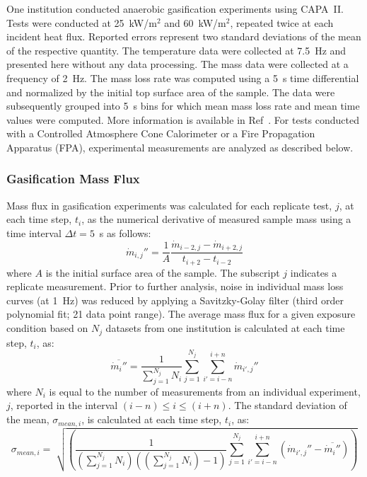 \documentclass{book}
\begin{document}
One institution conducted anaerobic gasification experiments using CAPA~II. Tests were conducted at 25~kW/m$^2$ and 60~kW/m$^2$, repeated twice at each incident heat flux. Reported errors represent two standard deviations of the mean of the respective quantity. The temperature data were collected at 7.5~Hz and presented here without any data processing. The mass data were collected at a frequency of 2~Hz. The mass loss rate was computed using a 5~s time differential and normalized by the initial top surface area of the sample. The data were subsequently grouped into 5~s bins for which mean mass loss rate and mean time values were computed. More information is available in Ref~\cite{fiola2020comparison}. For tests conducted with a Controlled Atmosphere Cone Calorimeter or a Fire Propagation Apparatus (FPA), experimental measurements are analyzed as described below.

\subsubsection{Gasification Mass Flux}

Mass flux in gasification experiments was calculated for each replicate test, $j$, at each time step, $t_i$, as the numerical derivative of measured sample mass using a time interval $\Delta t=5$~s as follows:
\begin{equation}
   \dot{m}_{i,j}'' = \frac{1}{A} \frac{\dot{m}_{i-2,j}-\dot{m}_{i+2,j}}{t_{i+2}-t_{i-2}}
\end{equation}
where $A$ is the initial surface area of the sample. The subscript $j$ indicates a replicate measurement. Prior to further analysis, noise in individual mass loss curves (at 1~Hz) was reduced by applying a Savitzky-Golay filter (third order polynomial fit; 21 data point range). The average mass flux for a given exposure condition based on $N_j$ datasets from one institution is calculated at each time step, $t_i$, as:
\begin{equation}
   \overline{\dot{m}_i''} = \frac{1}{\sum_{j=1}^{N_j}{N_i}} \sum_{j=1}^{N_j} \sum_{i'=i-n}^{i+n} \dot{m}_{i',j}''
\end{equation}
where $N_i$ is equal to the number of measurements from an individual experiment, $j$, reported in the interval $(i-n) \leq i \leq (i+n)$. The standard deviation of the mean, $\sigma_{mean,i}$, is calculated at each time step, $t_i$, as:
\begin{equation}
   \sigma_{mean,i} = \sqrt[]{\left(\frac{1}{({\sum_{j=1}^{N_j}{N_i}})(({\sum_{j=1}^{N_j}{N_i}})-1)} \sum_{j=1}^{N_j} \sum_{i'=i-n}^{i+n} \left( \dot{m}_{i',j}'' - \overline{\dot{m}_i''} \right) \right)}
\end{equation}
\end{document}
